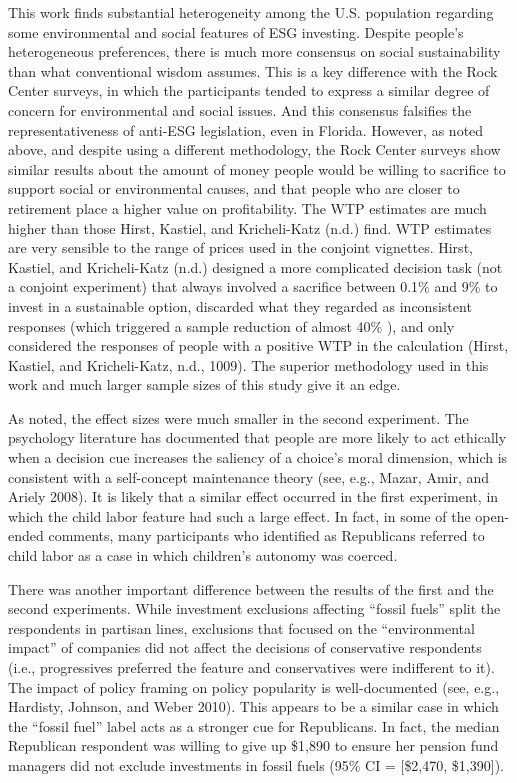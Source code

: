 \documentclass[
  12pt,
]{article}
\begin{document}
This work finds substantial heterogeneity among the U.S. population regarding some environmental and social features of ESG investing. Despite people's heterogeneous preferences, there is much more consensus on social sustainability than what conventional wisdom assumes. This is a key difference with the Rock Center surveys, in which the participants tended to express a similar degree of concern for environmental and social issues. And this consensus falsifies the representativeness of anti-ESG legislation, even in Florida. However, as noted above, and despite using a different methodology, the Rock Center surveys show similar results about the amount of money people would be willing to sacrifice to support social or environmental causes, and that people who are closer to retirement place a higher value on profitability. The WTP estimates are much higher than those Hirst, Kastiel, and Kricheli-Katz (n.d.) find. WTP estimates are very sensible to the range of prices used in the conjoint vignettes. Hirst, Kastiel, and Kricheli-Katz (n.d.) designed a more complicated decision task (not a conjoint experiment) that always involved a sacrifice between 0.1\% and 9\% to invest in a sustainable option, discarded what they regarded as inconsistent responses (which triggered a sample reduction of almost 40\% ), and only considered the responses of people with a positive WTP in the calculation (Hirst, Kastiel, and Kricheli-Katz, n.d., 1009). The superior methodology used in this work and much larger sample sizes of this study give it an edge.

As noted, the effect sizes were much smaller in the second experiment. The psychology literature has documented that people are more likely to act ethically when a decision cue increases the saliency of a choice's moral dimension, which is consistent with a self-concept maintenance theory (see, e.g., Mazar, Amir, and Ariely 2008). It is likely that a similar effect occurred in the first experiment, in which the child labor feature had such a large effect. In fact, in some of the open-ended comments, many participants who identified as Republicans referred to child labor as a case in which children's autonomy was coerced.

There was another important difference between the results of the first and the second experiments. While investment exclusions affecting ``fossil fuels'' split the respondents in partisan lines, exclusions that focused on the ``environmental impact'' of companies did not affect the decisions of conservative respondents (i.e., progressives preferred the feature and conservatives were indifferent to it). The impact of policy framing on policy popularity is well-documented (see, e.g., Hardisty, Johnson, and Weber 2010). This appears to be a similar case in which the ``fossil fuel'' label acts as a stronger cue for Republicans. In fact, the median Republican respondent was willing to give up \$1,890 to ensure her pension fund managers did not exclude investments in fossil fuels (95\% CI = {[}\$2,470, \$1,390{]}).
\end{document}
